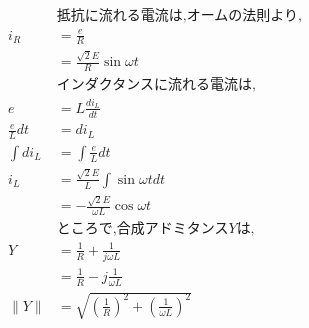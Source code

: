 \documentclass[twocolumn]{article}
\begin{document}
\begin{enumerate}
        \begin{align*}
                        & \text{抵抗に流れる電流は,オームの法則より,}                                                                                                      \\
          i_R           & = \frac{e}{R}                                                                                                                   \\
                        & = \frac{\sqrt{2}E}{R}\sin \omega t                                                                                              \\
                        & \text{インダクタンスに流れる電流は,}                                                                                                          \\
          e             & = L\frac{di_L}{dt}                                                                                                              \\
          \frac{e}{L}dt & = di_L                                                                                                                          \\
          \int di_L     & = \int \frac{e}{L}dt                                                                                                            \\
          i_L           & = \frac{\sqrt{2}E}{L} \int \sin \omega t dt                                                                                     \\
                        & = -\frac{\sqrt{2}E}{\omega L} \cos \omega t                                                                                     \\
                        & \text{ところで,合成アドミタンス}Y\text{は,}                                                                                                  \\
          Y             & = \frac{1}{R} + \frac{1}{j\omega L}                                                                                             \\
                        & = \frac{1}{R} - j\frac{1}{\omega L}                                                                                             \\
          \|Y\|         & = \sqrt{{\left(\frac{1}{R}\right)}^2 + {\left(\frac{1}{\omega L}\right)}^2}                                                     \\

\end{align*}
\end{enumerate}
\end{document}
